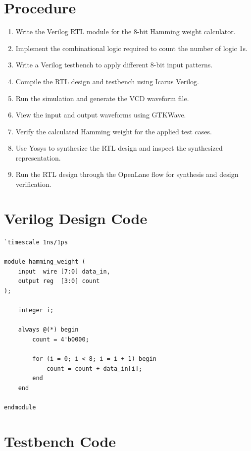 \documentclass[12pt,a4paper]{report}
\begin{document}
\section{Procedure}

\begin{enumerate}
    \item Write the Verilog RTL module for the 8-bit Hamming weight calculator.
    \item Implement the combinational logic required to count the number of logic 1s.
    \item Write a Verilog testbench to apply different 8-bit input patterns.
    \item Compile the RTL design and testbench using Icarus Verilog.
    \item Run the simulation and generate the VCD waveform file.
    \item View the input and output waveforms using GTKWave.
    \item Verify the calculated Hamming weight for the applied test cases.
    \item Use Yosys to synthesize the RTL design and inspect the synthesized representation.
    \item Run the RTL design through the OpenLane flow for synthesis and design verification.
\end{enumerate}

\section{Verilog Design Code}

\begin{verilogbox}
\begin{lstlisting}
`timescale 1ns/1ps

module hamming_weight (
    input  wire [7:0] data_in,
    output reg  [3:0] count
);

    integer i;

    always @(*) begin
        count = 4'b0000;

        for (i = 0; i < 8; i = i + 1) begin
            count = count + data_in[i];
        end
    end

endmodule
\end{lstlisting}
\end{verilogbox}

\section{Testbench Code}
\end{document}

